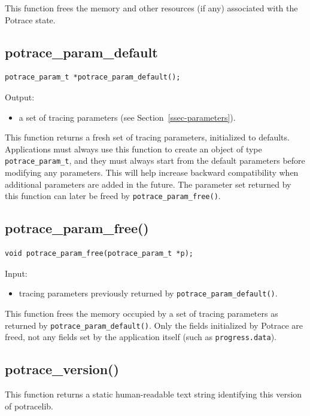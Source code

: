 \documentclass{article}
\begin{document}
This function frees the memory and other resources (if any) associated
with the Potrace state.

\subsection{potrace\_param\_default}\label{5c}

\begin{verbatim}
potrace_param_t *potrace_param_default();
\end{verbatim}

\noindent Output:
\begin{itemize}
\item a set of tracing parameters (see Section~\ref{ssec-parameters}). 
\end{itemize}

This function returns a fresh set of tracing parameters, initialized
to defaults.  Applications must always use this function to create an
object of type \verb!potrace_param_t!, and they must always start from
the default parameters before modifying any parameters.  This will
help increase backward compatibility when additional parameters are
added in the future. The parameter set returned by this function can
later be freed by \verb!potrace_param_free()!.

\subsection{potrace\_param\_free()}\label{5d}

\begin{verbatim}
void potrace_param_free(potrace_param_t *p);
\end{verbatim}

\noindent Input:
\begin{itemize}
\item tracing parameters previously returned by
  \verb!potrace_param_default()!.
\end{itemize}

This function frees the memory occupied by a set of tracing parameters
as returned by \verb!potrace_param_default()!. Only the fields
initialized by Potrace are freed, not any fields set by the
application itself (such as \verb!progress.data!).

\subsection{potrace\_version()}\label{5e}

This function returns a static human-readable text string identifying
this version of potracelib.
\end{document}

